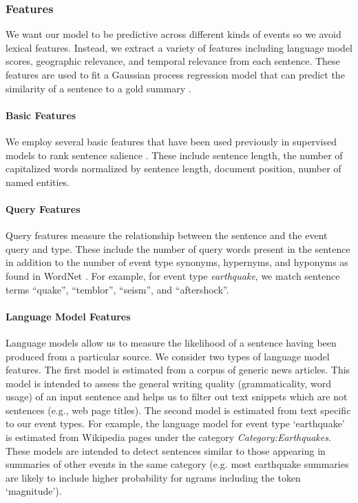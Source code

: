 \subsubsection{Features}
We want our model to be predictive across different kinds of events so we avoid lexical features.  Instead, we extract a variety of features including language model scores, geographic relevance, and temporal relevance from each sentence.  These features are used to fit a Gaussian process regression model that can predict the similarity of a sentence to a gold summary \cite{preotiuc2013temporal}.  

\paragraph{Basic Features}

We employ several basic features that have been used previously in supervised models to rank sentence salience \cite{kupiec1995trainable,conroy2001using}. These include sentence length, the number of capitalized words normalized by sentence length, document position, number of named entities.  

\paragraph{Query Features}

Query features measure the relationship between the sentence and the event query and type.  These include the number of query words present in the sentence in addition to the number of event type synonyms, hypernyms, and hyponyms as found in WordNet \cite{miller1995wordnet}.  For example, for event type \emph{earthquake},  we match sentence terms ``quake'', ``temblor'', ``seism'', and ``aftershock''.


\paragraph{Language Model Features}\label{subsubsec:lm}
Language models allow us to measure the likelihood of a sentence having been produced from a particular source.  We consider two types of language model features.  The first model is estimated from a corpus of generic news articles.  This model is intended to assess the general writing quality (grammaticality, word usage) of an input sentence and helps us to filter out text snippets which are not sentences (e.g., web page titles).  The second model is estimated from text specific to our event types.  For example, the language model for event type `earthquake' is estimated from Wikipedia pages under the category \emph{Category:Earthquakes}.  These models are intended to detect sentences similar to those appearing in summaries of other events in the same category (e.g. most earthquake summaries are likely to include higher probability for ngrams including the token `magnitude').  


